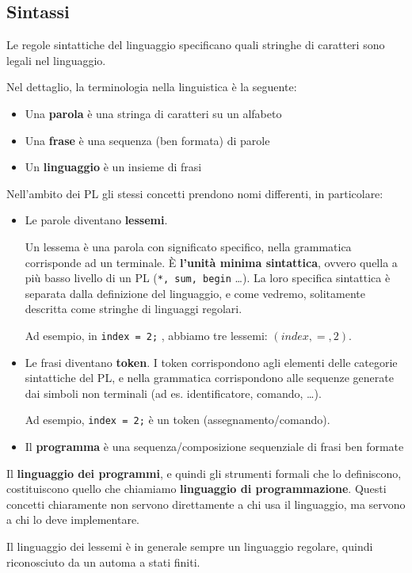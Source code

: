 \documentclass[12pt,a4paper]{article}
\begin{document}
\subsection{Sintassi}
Le regole sintattiche del linguaggio specificano quali stringhe di caratteri sono legali nel linguaggio.

Nel dettaglio, la terminologia nella linguistica è la seguente:
\begin{itemize}
\item Una \textbf{parola} è una stringa di caratteri su un alfabeto
\item Una \textbf{frase} è una sequenza (ben formata) di parole
\item Un \textbf{linguaggio} è un insieme di frasi
\end{itemize}

Nell'ambito dei PL gli stessi concetti prendono nomi differenti, in particolare: 
\begin{itemize}
\item Le parole diventano \textbf{lessemi}.

Un lessema è una parola con significato specifico, nella grammatica corrisponde ad un terminale. È \textbf{l'unità minima sintattica}, ovvero quella a più basso livello di un PL (\texttt{*, sum, begin} \ldots). La loro specifica sintattica è separata dalla definizione del linguaggio, e come vedremo, solitamente descritta come stringhe di linguaggi regolari.

Ad esempio, in \texttt{index = 2;} , abbiamo tre lessemi: $(index, =, 2)$.

\item Le frasi diventano \textbf{token}.
 I token corrispondono agli elementi delle categorie sintattiche del PL, e nella grammatica corrispondono alle sequenze generate dai simboli non terminali (ad es. identificatore, comando, \ldots).

Ad esempio, \texttt{index = 2;} è un token (assegnamento\slash comando).
\item Il \textbf{programma} è una sequenza\slash composizione sequenziale di frasi ben formate
\end{itemize}

Il \textbf{linguaggio dei programmi}, e quindi gli strumenti formali che lo definiscono, costituiscono quello che chiamiamo \textbf{linguaggio di programmazione}. Questi concetti chiaramente non servono direttamente a chi usa il linguaggio, ma servono a chi lo deve implementare.

Il linguaggio dei lessemi è in generale sempre un linguaggio regolare, quindi riconosciuto da un automa a stati finiti.
\end{document}
